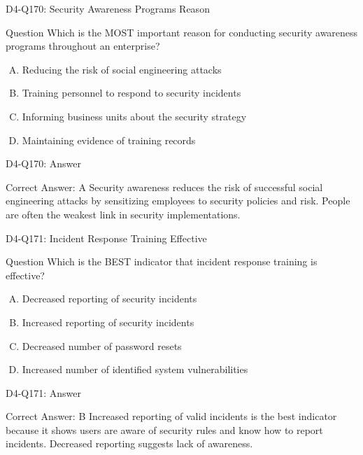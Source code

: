 \documentclass{beamer}
\begin{document}
	\begin{frame}{D4-Q170: Security Awareness Programs Reason}
		\begin{block}{Question}
			Which is the MOST important reason for conducting security awareness programs throughout an enterprise?
		\end{block}
		\begin{enumerate}[(A)]
			\item Reducing the risk of social engineering attacks
			\item Training personnel to respond to security incidents
			\item Informing business units about the security strategy
			\item Maintaining evidence of training records
		\end{enumerate}
	\end{frame}
	\begin{frame}{D4-Q170: Answer}
		\begin{block}{Correct Answer: A}
			Security awareness reduces the risk of successful social engineering attacks by sensitizing employees to security policies and risk. People are often the weakest link in security implementations.
		\end{block}
	\end{frame}
	
	\begin{frame}{D4-Q171: Incident Response Training Effective}
		\begin{block}{Question}
			Which is the BEST indicator that incident response training is effective?
		\end{block}
		\begin{enumerate}[(A)]
			\item Decreased reporting of security incidents
			\item Increased reporting of security incidents
			\item Decreased number of password resets
			\item Increased number of identified system vulnerabilities
		\end{enumerate}
	\end{frame}
	\begin{frame}{D4-Q171: Answer}
		\begin{block}{Correct Answer: B}
			Increased reporting of valid incidents is the best indicator because it shows users are aware of security rules and know how to report incidents. Decreased reporting suggests lack of awareness.
		\end{block}
	\end{frame}
	
\end{document}
